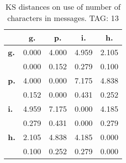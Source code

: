 \begin{table}[h!]
\begin{center}
\begin{tabular}{| l || c | c | c | c |}\hline
 & {\bf g.} & {\bf p.} & {\bf i.} & {\bf h.} \\\hline\hline
{\bf g.} & 0.000 & 4.000 & 4.959 & 2.105 \\
{\bf } & 0.000 & 0.152 & 0.279 & 0.100 \\\hline
{\bf p.} & 4.000 & 0.000 & 7.175 & 4.838 \\
{\bf } & 0.152 & 0.000 & 0.431 & 0.252 \\\hline
{\bf i.} & 4.959 & 7.175 & 0.000 & 4.185 \\
{\bf } & 0.279 & 0.431 & 0.000 & 0.279 \\\hline
{\bf h.} & 2.105 & 4.838 & 4.185 & 0.000 \\
{\bf } & 0.100 & 0.252 & 0.279 & 0.000 \\\hline
\end{tabular}
\caption{KS distances on use of number of characters in messages. TAG: 13}
\end{center}
\end{table}
